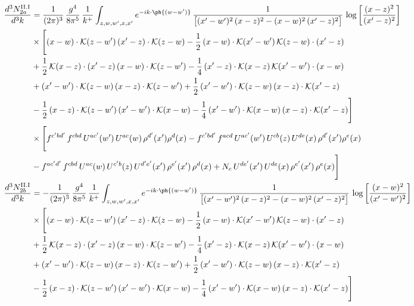 \begin{align}
\frac{d^{3}N^{\rm II.I}_{2a}}{d^{3}k}&=\frac{1}{(2\pi)^{3}}\,\frac{g^{4}}{8\pi^{5}}\,\frac{1}{k^{+}}\int_{z,w,w^{\prime},x,x^{\prime}}e^{-ik\cdot\ph{(w-w^{\prime})}}\,\frac{1}{\big[(x^{\prime}-w^{\prime})^{2}\,(x-z)^{2}-(x-w)^{2}\,(x^{\prime}-z)^{2}\big]}\,\log\left[\frac{(x-z)^{2}}{(x^{\prime}-z)^{2}}\right]\notag\\
&\times\Bigg[(x-w)\cdot\mathcal{K}(z-w^{\prime})\,(x^{\prime}-z)\cdot\mathcal{K}(z-w)-\frac{1}{2}\,(x-w)\cdot\mathcal{K}(x^{\prime}-w^{\prime})\,\mathcal{K}(z-w)\cdot(x^{\prime}-z)\notag \\ & +\frac{1}{2}\,\mathcal{K}(x-z)\cdot(x^{\prime}-z)\,(x-w)\cdot\mathcal{K}(z-w^{\prime}) -\frac{1}{4}\,(x^{\prime}-z)\cdot\mathcal{K}(x-z)\,\mathcal{K}(x^{\prime}-w^{\prime})\cdot(x-w)\notag \\ & +(x^{\prime}-w^{\prime})\cdot\mathcal{K}(z-w)\,(x-z)\cdot\mathcal{K}(z-w^{\prime})+\frac{1}{2}\,(x^{\prime}-w^{\prime})\cdot\mathcal{K}(z-w)\,(x-z)\cdot\mathcal{K}(x^{\prime}-z)\notag \\ & -\frac{1}{2}\,(x-z)\cdot\mathcal{K}(z-w^{\prime})\,(x^{\prime}-w^{\prime})\cdot\mathcal{K}(x-w)-\frac{1}{4}\,(x^{\prime}-w^{\prime})\cdot\mathcal{K}(x-w)\,(x-z)\cdot\mathcal{K}(x^{\prime}-z)\Bigg]\notag \\ & \times\Bigg[f^{c^{\prime}bd^{\prime}}\,f^{cbd}\, U^{ac^{\prime}}(w^{\prime})\,U^{ac}(w)\,\rho^{d^{\prime}}(x^{\prime})\rho^{d}(x)- f^{c^{\prime}bd^{\prime}}\,f^{acd}\,U^{ac^{\prime}}(w^{\prime})\,U^{cb}(z)\,U^{de}(x)\,\rho^{d^{\prime}}(x^{\prime})\rho^{e}(x) \notag \\ & -f^{ac^{\prime}d^{\prime}}\,f^{cbd}\,U^{ac}(w)\,U^{c^{\prime}b}(z)\,U^{d^{\prime}e^{\prime}}(x^{\prime})\,\rho^{e^{\prime}}(x^{\prime})\,\rho^{d}(x) +N_{c}\,U^{de^{\prime}}(x^{\prime})\,U^{de}(x)\,\rho^{e^{\prime}}(x^{\prime})\,\rho^{e}(x)\Bigg]\label{eq:B-II2a}\\
\frac{d^{3}N^{\rm II.I}_{2b}}{d^{3}k}&= -\frac{1}{(2\pi)^{3}}\,\frac{g^{4}}{8\pi^{5}}\,\frac{1}{k^{+}}\int_{z,w,w^{\prime},x,x^{\prime}}e^{-ik\cdot\ph{(w-w^{\prime})}}\,\frac{1}{\big[(x^{\prime}-w^{\prime})^{2}\,(x-z)^{2}-(x-w)^{2}\,(x^{\prime}-z)^{2}\big]}\,\log\left[\frac{(x-w)^{2}}{(x^{\prime}-w^{\prime})^{2}}\right]\notag\\
&\times\Bigg[(x-w)\cdot\mathcal{K}(z-w^{\prime})\,(x^{\prime}-z)\cdot\mathcal{K}(z-w)-\frac{1}{2}\,(x-w)\cdot\mathcal{K}(x^{\prime}-w^{\prime})\,\mathcal{K}(z-w)\cdot(x^{\prime}-z)\notag \\ & +\frac{1}{2}\,\mathcal{K}(x-z)\cdot(x^{\prime}-z)\,(x-w)\cdot\mathcal{K}(z-w^{\prime}) -\frac{1}{4}\,(x^{\prime}-z)\cdot\mathcal{K}(x-z)\,\mathcal{K}(x^{\prime}-w^{\prime})\cdot(x-w)\notag \\ & +(x^{\prime}-w^{\prime})\cdot\mathcal{K}(z-w)\,(x-z)\cdot\mathcal{K}(z-w^{\prime})+\frac{1}{2}\,(x^{\prime}-w^{\prime})\cdot\mathcal{K}(z-w)\,(x-z)\cdot\mathcal{K}(x^{\prime}-z)\notag \\ & -\frac{1}{2}\,(x-z)\cdot\mathcal{K}(z-w^{\prime})\,(x^{\prime}-w^{\prime})\cdot\mathcal{K}(x-w)-\frac{1}{4}\,(x^{\prime}-w^{\prime})\cdot\mathcal{K}(x-w)\,(x-z)\cdot\mathcal{K}(x^{\prime}-z)\Bigg]\notag\\

\end{align}
